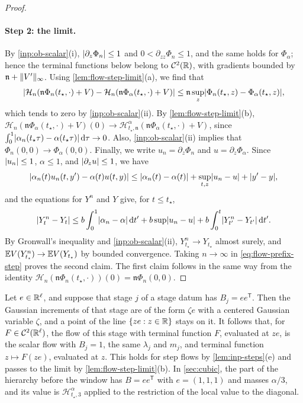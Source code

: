 \begin{proof}
\paragraph{Step 2: the limit.} By \cref{inp:ob-scalar}(i), $\lvert \partial_z\Phi_n\rvert\le1$
and $0<\partial_{zz}\Phi_n\le1$, and the same holds for $\Phi_\alpha$; hence the
terminal functions below belong to $\mathcal C^2(\mathbb R)$, with gradients bounded by
$\mathfrak n+\lVert V'\rVert_\infty$. Using \cref{lem:flow-step-limit}(a), we find that
\[
 \lvert \mathcal H_n(\mathfrak n\Phi_n(t_\star,\cdot)+V)-\mathcal H_n(\mathfrak n\Phi_\alpha(t_\star,\cdot)+V)\rvert
 \le\mathfrak n\sup_z\lvert \Phi_n(t_\star,z)-\Phi_\alpha(t_\star,z)\rvert,
\]
which tends to zero by \cref{inp:ob-scalar}(ii). By \cref{lem:flow-step-limit}(b),
$\mathcal H_n(\mathfrak n\Phi_\alpha(t_\star,\cdot)+V)(0)\to\mathcal H^\alpha_{t_\star,\mathfrak n}
(\mathfrak n\Phi_\alpha(t_\star,\cdot)+V)$, since
$\int_0^1\lvert \alpha_n(t_\star\tau)-\alpha(t_\star\tau)\rvert\,\mathrm d\tau\to0$. Also,
\cref{inp:ob-scalar}(ii) implies that $\Phi_n(0,0)\to\Phi_\alpha(0,0)$. Finally, we write
$u_n=\partial_z\Phi_n$ and $u=\partial_z\Phi_\alpha$. Since $\lvert u_n\rvert\le1$,
$\alpha\le1$, and $\lvert \partial_zu\rvert\le1$, we have
\[
 \lvert \alpha_n(t)u_n(t,y')-\alpha(t)u(t,y)\rvert
 \le\lvert \alpha_n(t)-\alpha(t)\rvert+\sup_{t,z}\lvert u_n-u\rvert+\lvert y'-y\rvert,
\]
and the equations for $Y^n$ and $Y$ give, for $t\le t_\star$,
\[
 \lvert Y^n_t-Y_t\rvert\le b\int_0^1\lvert \alpha_n-\alpha\rvert\,\mathrm d t'+b\sup\lvert u_n-u\rvert
 +b\int_0^t\lvert Y^n_{t'}-Y_{t'}\rvert\,\mathrm d t'.
\]
By Gronwall's inequality and \cref{inp:ob-scalar}(ii), $Y^n_{t_\star}\to Y_{t_\star}$
almost surely, and $\mathbb E V(Y^n_{t_\star})\to\mathbb E V(Y_{t_\star})$ by bounded convergence.
Taking $n\to\infty$ in \eqref{eq:flow-prefix-step} proves the second claim. The
first claim follows in the same way from the identity
$\mathcal H_n(\mathfrak n\Phi_n(t_\star,\cdot))(0)=\mathfrak n\Phi_n(0,0)$.
\end{proof}

\begin{remark}\label{rem:flow-diagonal}
Let $e\in\mathbb R^\ell$, and suppose that stage $j$ of a stage datum has $B_j=ee^{\mathsf T}$.
Then the Gaussian increments of that stage are of the form $\zeta e$ with a
centered Gaussian variable $\zeta$, and a point of the line $\{ze:z\in\mathbb R\}$ stays
on it. It follows that, for $F\in\mathcal C^2(\mathbb R^\ell)$, the flow of this stage with
terminal function $F$, evaluated at $ze$, is the scalar flow with $B_j=1$, the
same $\lambda_j$ and $m_j$, and terminal function $z\mapsto F(ze)$, evaluated at
$z$. This holds for step flows by \cref{lem:inp-steps}(e) and passes to the limit
by \cref{lem:flow-step-limit}(b). In \cref{sec:cubic}, the part of the hierarchy
before the window has $B=ee^{\mathsf T}$ with $e=(1,1,1)$ and masses $\alpha/3$,
and its value is $\mathcal H^\alpha_{t_\star,3}$ applied to the restriction of the
local value to the diagonal.
\end{remark}

